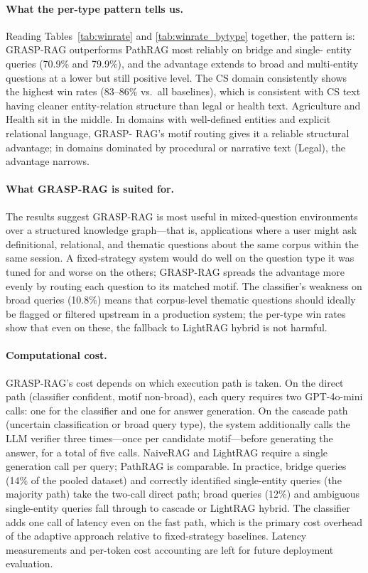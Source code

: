 \paragraph{What the per-type pattern tells us.}
Reading Tables~\ref{tab:winrate} and \ref{tab:winrate_bytype} together, the
pattern is: GRASP-RAG outperforms PathRAG most reliably on bridge and single-
entity queries (70.9\% and 79.9\%), and the advantage extends to broad and
multi-entity questions at a lower but still positive level.
The CS domain consistently shows the highest win rates (83--86\% vs.\ all
baselines), which is consistent with CS text having cleaner entity-relation
structure than legal or health text.
Agriculture and Health sit in the middle.
In domains with well-defined entities and explicit relational language, GRASP-
RAG's motif routing gives it a reliable structural advantage; in domains
dominated by procedural or narrative text (Legal), the advantage narrows.

\paragraph{What GRASP-RAG is suited for.}
The results suggest GRASP-RAG is most useful in mixed-question environments
over a structured knowledge graph---that is, applications where a user might
ask definitional, relational, and thematic questions about the same corpus
within the same session.
A fixed-strategy system would do well on the question type it was tuned for
and worse on the others; GRASP-RAG spreads the advantage more evenly by
routing each question to its matched motif.
The classifier's weakness on broad queries (10.8\%) means that corpus-level
thematic questions should ideally be flagged or filtered upstream in a
production system; the per-type win rates show that even on these, the
fallback to LightRAG hybrid is not harmful.

\paragraph{Computational cost.}
GRASP-RAG's cost depends on which execution path is taken.
On the direct path (classifier confident, motif non-broad), each query
requires two GPT-4o-mini calls: one for the classifier and one for answer
generation.
On the cascade path (uncertain classification or broad query type), the
system additionally calls the LLM verifier three times---once per candidate
motif---before generating the answer, for a total of five calls.
NaiveRAG and LightRAG require a single generation call per query; PathRAG is
comparable.
In practice, bridge queries (14\% of the pooled dataset) and correctly
identified single-entity queries (the majority path) take the two-call direct
path; broad queries (12\%) and ambiguous single-entity queries fall through to
cascade or LightRAG hybrid.
The classifier adds one call of latency even on the fast path, which is the
primary cost overhead of the adaptive approach relative to fixed-strategy
baselines.
Latency measurements and per-token cost accounting are left for future
deployment evaluation.

